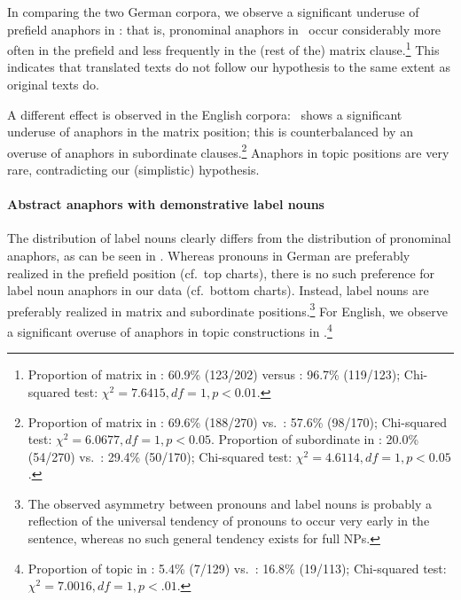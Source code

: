 \documentclass[output=paper]{LSP/langsci}
\begin{document}
\largerpage[-2]
In comparing the two German corpora, we observe a significant underuse of prefield anaphors in \DEt: that is, pronominal anaphors in \DEo\ occur considerably more often in the prefield and less frequently in the (rest of the) matrix clause.\footnote{%
Proportion of matrix in \DEo: 60.9\%  (123/202) versus \DEt: 96.7\% (119/123); Chi-squared test: $\chi^2=7.6415, df=1, p<0.01$.}%
 This indicates that translated texts do not follow our hypothesis to the same extent as original texts do.

A different effect is observed in the English corpora: \ENt\ shows a significant underuse of anaphors in the matrix position; this is counterbalanced by an overuse of anaphors in subordinate clauses.\footnote{%
Proportion of matrix in \ENo: 69.6\%  (188/270) vs.\ \ENt: 57.6\% (98/170); Chi-squared test: $\chi^2=6.0677, df=1, p<0.05$. Proportion of subordinate in \ENo: 20.0\% (54/270) vs.\ \ENt: 29.4\% (50/170); Chi-squared test: $\chi^2=4.6114, df=1, p<0.05$.}%
 Anaphors in topic positions are very rare, contradicting our (simplistic) hypothesis.


 

\paragraph*{Abstract anaphors with demonstrative label nouns}

The distribution of label nouns clearly differs from the distribution of pronominal anaphors, as can be seen in . Whereas pronouns in German are preferably realized in the prefield position (cf.\ top charts), there is no such preference for label noun anaphors in our data (cf.\ bottom charts). Instead, label nouns are preferably realized in matrix and subordinate positions.\footnote{%
The observed asymmetry between pronouns and label nouns is probably a reflection of the universal tendency of pronouns to occur very early in the sentence, whereas no such general tendency exists for full NPs.} %
For English, we observe a significant overuse of anaphors in topic constructions in \ENt.\footnote{%
Proportion of topic in \ENo: 5.4\% (7/129) vs.\ \ENt: 16.8\% (19/113); Chi-squared test: $\chi^2=7.0016, df=1, p<.01$.} %
\end{document}
